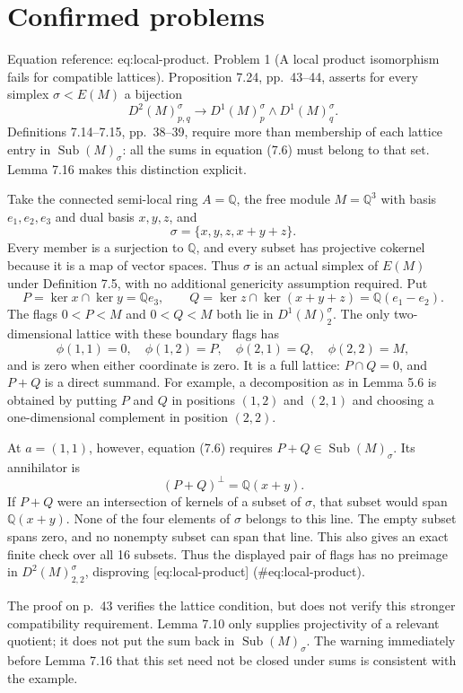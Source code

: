 \documentclass[10pt]{article}
\begin{document}
\section*{Confirmed problems}
Equation reference: eq:local-product. Problem 1 (A local product isomorphism fails for compatible lattices).  Proposition 7.24, pp. 43–44, asserts for every simplex \(\sigma<E(M)\) a bijection \[
 D^2(M)^\sigma_{p,q}\longrightarrow
 D^1(M)^\sigma_p\wedge D^1(M)^\sigma_q.\] Definitions 7.14–7.15, pp. 38–39, require more than membership of each lattice entry in \(\operatorname{Sub}(M)_\sigma\): all the sums in equation (7.6) must belong to that set. Lemma 7.16 makes this distinction explicit.\par
Take the connected semi-local ring \(A=\mathbb Q\), the free module \(M=\mathbb Q^3\) with basis \(e_1,e_2,e_3\) and dual basis \(x,y,z\), and \[\sigma=\{x,y,z,x+y+z\}.\] Every member is a surjection to \(\mathbb Q\), and every subset has projective cokernel because it is a map of vector spaces. Thus \(\sigma\) is an actual simplex of \(E(M)\) under Definition 7.5, with no additional genericity assumption required. Put \[P=\ker x\cap\ker y=\mathbb Qe_3,\qquad
 Q=\ker z\cap\ker(x+y+z)=\mathbb Q(e_1-e_2).\] The flags \(0<P<M\) and \(0<Q<M\) both lie in \(D^1(M)^\sigma_2\). The only two-dimensional lattice with these boundary flags has \[\phi(1,1)=0,\quad \phi(1,2)=P,\quad
 \phi(2,1)=Q,\quad \phi(2,2)=M,\] and is zero when either coordinate is zero. It is a full lattice: \(P\cap Q=0\), and \(P+Q\) is a direct summand. For example, a decomposition as in Lemma 5.6 is obtained by putting \(P\) and \(Q\) in positions \((1,2)\) and \((2,1)\) and choosing a one-dimensional complement in position \((2,2)\).\par
At \(a=(1,1)\), however, equation (7.6) requires \(P+Q\in\operatorname{Sub}(M)_\sigma\). Its annihilator is \[(P+Q)^\perp=\mathbb Q(x+y).\] If \(P+Q\) were an intersection of kernels of a subset of \(\sigma\), that subset would span \(\mathbb Q(x+y)\). None of the four elements of \(\sigma\) belongs to this line. The empty subset spans zero, and no nonempty subset can span that line. This also gives an exact finite check over all 16 subsets. Thus the displayed pair of flags has no preimage in \(D^2(M)^\sigma_{2,2}\), disproving [eq:local-product] (\#eq:local-product).\par
The proof on p. 43 verifies the lattice condition, but does not verify this stronger compatibility requirement. Lemma 7.10 only supplies projectivity of a relevant quotient; it does not put the sum back in \(\operatorname{Sub}(M)_\sigma\). The warning immediately before Lemma 7.16 that this set need not be closed under sums is consistent with the example.\par
\end{document}
